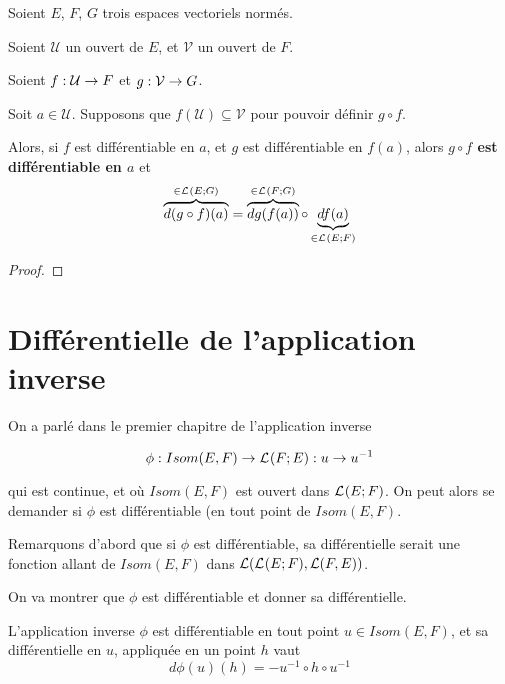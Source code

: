 \begin{theorem}
\label{theorem:chain_rule}
	Soient $E$, $F$, $G$ trois espaces vectoriels normés.

	Soient $\mathcal{U}$ un ouvert de $E$, et $\mathcal{V}$ un ouvert de $F$.

	Soient $f : \mathcal{U} \rightarrow F$ et
	$g : \mathcal{V} \rightarrow G$.

	Soit $a \in \mathcal{U}$.
	Supposons que $f(\mathcal{U}) \subseteq \mathcal{V}$ pour pouvoir définir $g
	\circ f$.

	Alors, si $f$ est différentiable en $a$, et $g$ est différentiable en
	$f(a)$, alors \textbf{$g \circ f$ est différentiable en $a$} et
	\begin{equation*}
		\overbrace{d(g \circ f)(a)}^{\in \mathcal{L}_{}(E; G)} =
		\overbrace{dg(f(a))}^{\in \mathcal{L}_{}(F; G)} \circ
		\underbrace{df(a)}_{\in \mathcal{L}_{}(E; F)}
	\end{equation*}
\end{theorem}

\ifdefined\outputproof
\begin{proof}

\end{proof}
\fi

\section{Différentielle de l'application inverse}

On a parlé dans le premier chapitre de l'application inverse

\begin{equation*}
	\phi : Isom(E, F) \rightarrow \mathcal{L}_{}(F; E) : u \rightarrow u^{-1}
\end{equation*}

qui est continue, et où $Isom(E, F)$ est ouvert dans
$\mathcal{L}_{}(E; F)$.
On peut alors se demander si $\phi$ est différentiable (en tout point de
$Isom(E, F)$.

Remarquons d'abord que si $\phi$ est différentiable, sa différentielle serait
une fonction allant de $Isom(E, F)$ dans $\mathcal{L}(\mathcal{L}_{}(E; F), \mathcal{L}(F,
E))$.

On va montrer que $\phi$ est différentiable et donner sa différentielle.

\begin{theorem}
\label{differential_inverse_application}
	L'application inverse $\phi$ est différentiable en tout point $u \in Isom(E,
	F)$, et sa différentielle en $u$, appliquée en un point $h$ vaut
	\begin{equation*}
		d\phi(u)(h) = -u^{-1} \circ h \circ u^{-1}
	\end{equation*}
\end{theorem}


